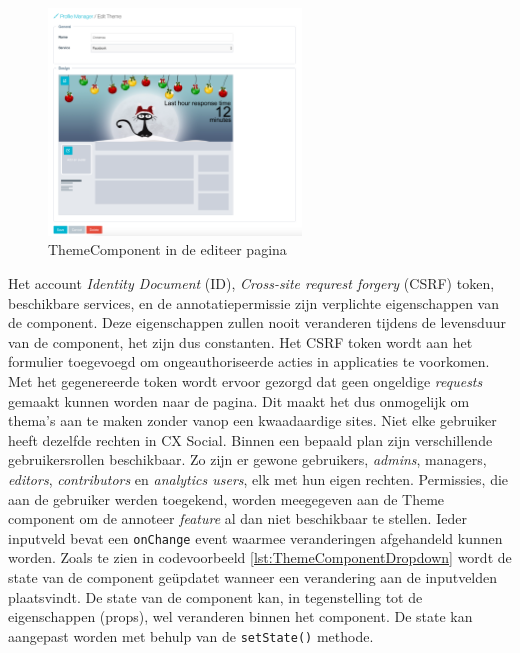 \begin{figure}[H]
	\centering
	\includegraphics[width=0.6\textwidth]{Figuren/ThemeComponent.png}
	\caption{ThemeComponent in de editeer pagina}
	\label{fig:ThemeComponent}
\end{figure} 

Het account \textit{Identity Document} (ID), \textit{Cross-site requrest forgery} (CSRF) token, beschikbare services, en de annotatiepermissie zijn verplichte eigenschappen van de component. Deze eigenschappen zullen nooit veranderen tijdens de levensduur van de component, het zijn dus constanten. Het CSRF token wordt aan het formulier toegevoegd om ongeauthoriseerde acties in applicaties te voorkomen. Met het gegenereerde token wordt ervoor gezorgd dat geen ongeldige \textit{requests} gemaakt kunnen worden naar de pagina. Dit maakt het dus onmogelijk om thema's aan te maken zonder vanop een kwaadaardige sites.  %
Niet elke gebruiker heeft dezelfde rechten in CX Social. Binnen een bepaald plan zijn verschillende gebruikersrollen beschikbaar. Zo zijn er gewone gebruikers, \textit{admins}, managers, \textit{editors}, \textit{contributors} en \textit{analytics users}, elk met hun eigen rechten. Permissies, die aan de gebruiker werden toegekend, worden meegegeven aan de Theme component om de annoteer \textit{feature} al dan niet beschikbaar te stellen. Ieder inputveld bevat een \texttt{onChange} event waarmee veranderingen afgehandeld kunnen worden. Zoals te zien in codevoorbeeld \ref{lst:ThemeComponentDropdown} wordt de state van de component ge\"{u}pdatet wanneer een verandering aan de inputvelden plaatsvindt. De state van de component kan, in tegenstelling tot de eigenschappen (props), wel veranderen binnen het component. De state kan aangepast worden met behulp van  de \texttt{setState()} methode. 

